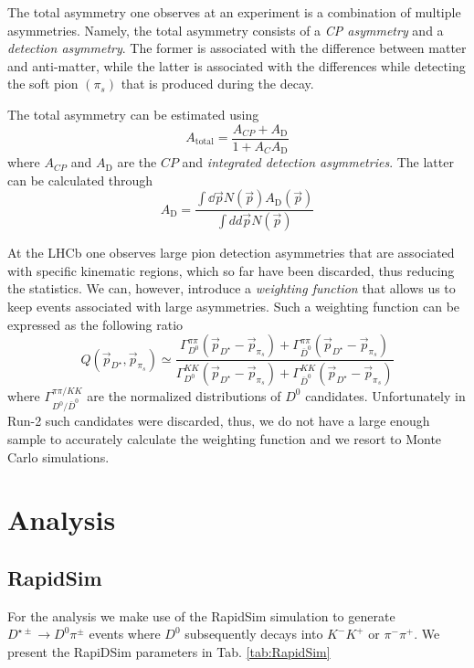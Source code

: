\documentclass{article}
\begin{document}
        The total asymmetry one observes at an experiment is a combination of multiple asymmetries.
        Namely, the total asymmetry consists of a \textit{CP asymmetry} and a \textit{detection asymmetry}.
        The former is associated with the difference between matter and anti-matter, while the latter is associated with the differences while detecting the soft pion $(\pi_s)$ that is produced during the decay.

        The total asymmetry can be estimated using 
        \begin{equation}
                \label{eq:total}
                A_\text{total} = \frac{A_{CP} + A_\text{D}}{1 + A_{C}A_\text{D}}
        \end{equation}
        where $A_{CP}$ and $A_\text{D}$ are the $CP$ and \textit{integrated detection asymmetries}.
        The latter can be calculated through
        \begin{equation}
                A_\text{D} = \frac{\int \dd \vec{p} N(\vec{p})A_\text{D}(\vec{p})}{\int dd \vec{p} N(\vec{p})}
        \end{equation}


        At the LHCb one observes large pion detection asymmetries that are associated with specific kinematic regions, which so far have been discarded, thus reducing the statistics.
        We can, however, introduce a \textit{weighting function} that allows us to keep events associated with large asymmetries.
        Such a weighting function can be expressed as the following ratio
        \begin{equation}
                \label{eq:weighting}
                Q(\vec{p}_{D^\star}, \vec{p}_{\pi_s}) \simeq \frac{\Gamma_{D^0}^{\pi\pi}(\vec{p}_{D^\star} - \vec{p}_{\pi_s}) + \Gamma_{\bar{D}^0}^{\pi\pi}(\vec{p}_{D^\star} - \vec{p}_{\pi_s})}{\Gamma_{D^0}^{KK}(\vec{p}_{D^\star} - \vec{p}_{\pi_s}) + \Gamma_{\bar{D}^0}^{KK}(\vec{p}_{D^\star} - \vec{p}_{\pi_s})}
        \end{equation}
        where $\Gamma_{D^{0}/\bar{D}^0}^{\pi\pi/KK}$ are the normalized distributions of $D^0$ candidates.
        Unfortunately in Run-2 such candidates were discarded, thus, we do not have a large enough sample to accurately calculate the weighting function and we resort to Monte Carlo simulations.

        
        \section{Analysis}
        \subsection{RapidSim}
        For the analysis we make use of the RapidSim simulation \cite{Cowan:2016tnm} to generate $D^{\star \pm}\to D^0 \pi^\pm$ events where $D^0$ subsequently decays into $K^-K^+$ or $\pi^-\pi^+$.
        We present the RapiDSim parameters in Tab. \ref{tab:RapidSim}
\end{document}

